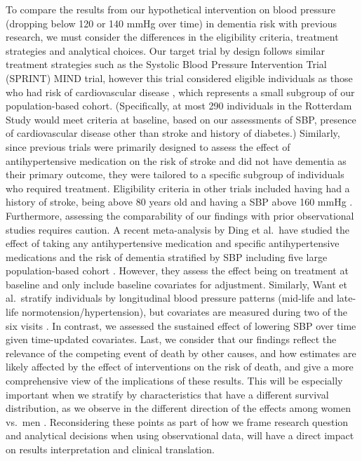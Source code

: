 \documentclass[
]{book}
\begin{document}
To compare the results from our hypothetical intervention on blood pressure (dropping below 120 or 140 mmHg over time) in dementia risk with previous research, we must consider the differences in the eligibility criteria, treatment strategies and analytical choices. Our target trial by design follows similar treatment strategies such as the Systolic Blood Pressure Intervention Trial (SPRINT) MIND trial, however this trial considered eligible individuals as those who had risk of cardiovascular disease \autocite{williamson2019}, which represents a small subgroup of our population-based cohort. (Specifically, at most 290 individuals in the Rotterdam Study would meet criteria at baseline, based on our assessments of SBP, presence of cardiovascular disease other than stroke and history of diabetes.) Similarly, since previous trials were primarily designed to assess the effect of antihypertensive medication on the risk of stroke and did not have dementia as their primary outcome, they were tailored to a specific subgroup of individuals who required treatment. Eligibility criteria in other trials included having had a history of stroke, being above 80 years old and having a SBP above 160 mmHg \autocite{ace_inhibitors2000,prince1996,forette2002,progress2003,lithell2003,diener2008,anderson2011,williamson2019,bosch2019}. Furthermore, assessing the comparability of our findings with prior observational studies requires caution. A recent meta-analysis by Ding et al.~have studied the effect of taking any antihypertensive medication and specific antihypertensive medications and the risk of dementia stratified by SBP including five large population-based cohort \autocite{ding2020}. However, they assess the effect being on treatment at baseline and only include baseline covariates for adjustment. Similarly, Want et al.~stratify individuals by longitudinal blood pressure patterns (mid-life and late-life normotension/hypertension), but covariates are measured during two of the six visits \autocite{walker2019}. In contrast, we assessed the sustained effect of lowering SBP over time given time-updated covariates. Last, we consider that our findings reflect the relevance of the competing event of death by other causes, and how estimates are likely affected by the effect of interventions on the risk of death, and give a more comprehensive view of the implications of these results. This will be especially important when we stratify by characteristics that have a different survival distribution, as we observe in the different direction of the effects among women vs.~men \autocite{beam2018}. Reconsidering these points as part of how we frame research question and analytical decisions when using observational data, will have a direct impact on results interpretation and clinical translation.
\end{document}
